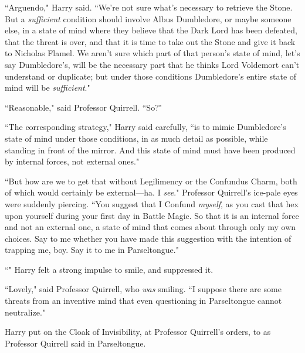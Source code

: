 ``Arguendo," Harry said. ``We're not sure what's necessary to retrieve the Stone. But a \emph{sufficient} condition should involve Albus Dumbledore, or maybe someone else, in a state of mind where they believe that the Dark Lord has been defeated, that the threat is over, and that it is time to take out the Stone and give it back to Nicholas Flamel. We aren't sure which part of that person's state of mind, let's say Dumbledore's, will be the necessary part that he thinks Lord Voldemort can't understand or duplicate; but under those conditions Dumbledore's entire state of mind will be \emph{sufficient}."

``Reasonable," said Professor Quirrell. ``So?"

``The corresponding strategy," Harry said carefully, ``is to mimic Dumbledore's state of mind under those conditions, in as much detail as possible, while standing in front of the mirror. And this state of mind must have been produced by internal forces, not external ones."

``But how are we to get that without Legilimency or the Confundus Charm, both of which would certainly be external---ha. I \emph{see}." Professor Quirrell's ice-pale eyes were suddenly piercing. ``You suggest that I Confund \emph{myself}, as you cast that hex upon yourself during your first day in Battle Magic. So that it is an internal force and not an external one, a state of mind that comes about through only my own choices. Say to me whether you have made this suggestion with the intention of trapping me, boy. Say it to me in Parseltongue."

``" Harry felt a strong impulse to smile, and suppressed it.

``Lovely," said Professor Quirrell, who \emph{was} smiling. ``I suppose there are some threats from an inventive mind that even questioning in Parseltongue cannot neutralize."

\later

Harry put on the Cloak of Invisibility, at Professor Quirrell's orders, to  as Professor Quirrell said in Parseltongue.

